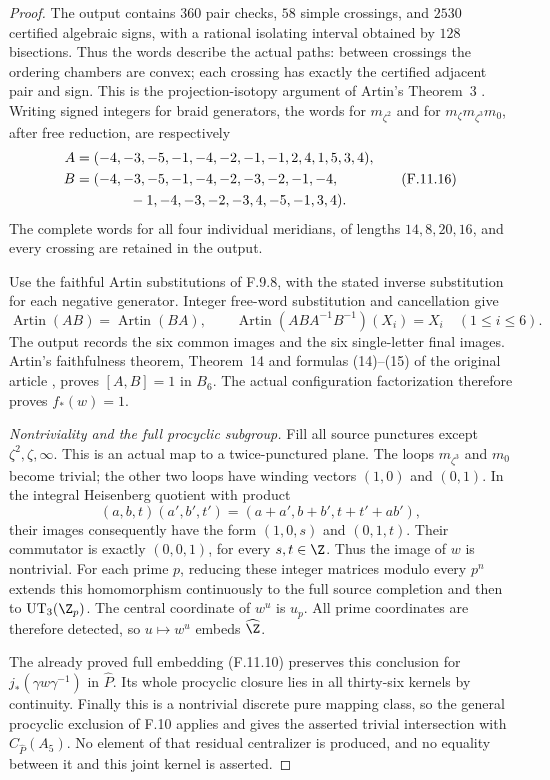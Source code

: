 \begin{proof}
The output contains $360$ pair checks,
$58$ simple crossings, and $2530$ certified
algebraic signs, with a rational isolating
interval obtained by $128$ bisections.
Thus the words describe the actual paths:
between crossings the ordering chambers
are convex; each crossing has exactly the
certified adjacent pair and sign.
This is the projection-isotopy argument
of Artin's Theorem~3 \cite{A-Artin1947}.
Writing signed integers for braid generators,
the words for $m_{\zeta^2}$ and for
$m_\zeta m_{\zeta^3}m_0$, after free reduction,
are respectively
\[
\begin{split}
 A={}&(-4,-3,-5,-1,-4,-2,-1,-1,2,4,1,5,3,4),\\
 B={}&(-4,-3,-5,-1,-4,-2,-3,-2,-1,-4,\\
     &\hspace{9mm}-1,-4,-3,-2,-3,4,-5,-1,3,4).
\end{split}                                                     \tag{F.11.16}
\]
The complete words for all four individual
meridians, of lengths $14,8,20,16$, and
every crossing are retained in the output.

Use the faithful Artin substitutions of F.9.8,
with the stated inverse substitution for
each negative generator.  Integer free-word
substitution and cancellation give
\[
       \operatorname{Artin}(AB)
           =\operatorname{Artin}(BA),\qquad
       \operatorname{Artin}(ABA^{-1}B^{-1})(X_i)=X_i
                    \quad(1\leq i\leq6).                       \tag{F.11.17}
\]
The output records the six common images
and the six single-letter final images.
Artin's faithfulness theorem, Theorem~14
and formulas (14)--(15) of the original
article \cite{A-Artin1947}, proves
$[A,B]=1$ in $B_6$.
The actual configuration factorization
therefore proves $f_*(w)=1$.

\emph{Nontriviality and the full procyclic subgroup.}
Fill all source punctures except
$\zeta^2,\zeta,\infty$.
This is an actual map to a twice-punctured
plane.  The loops $m_{\zeta^3}$ and $m_0$
become trivial; the other two loops have
winding vectors $(1,0)$ and $(0,1)$.
In the integral Heisenberg quotient with
product
\[
 (a,b,t)(a',b',t')
       =(a+a',b+b',t+t'+ab'),
\]
their images consequently have the form
$(1,0,s)$ and $(0,1,t)$.
Their commutator is exactly $(0,0,1)$,
for every $s,t\in\Z$.
Thus the image of $w$ is nontrivial.
For each prime $p$, reducing these integer
matrices modulo every $p^n$ extends this
homomorphism continuously to the full
source completion and then to
$\operatorname{UT}_3(\Z_p)$.
The central coordinate of $w^u$ is $u_p$.
All prime coordinates are therefore
detected, so
$u\mapsto w^u$ embeds $\widehat\Z$.

The already proved full embedding
(F.11.10) preserves this conclusion for
$j_*(\gamma w\gamma^{-1})$ in $\widehat P$.
Its whole procyclic closure lies in all
thirty-six kernels by continuity.
Finally this is a nontrivial discrete
pure mapping class, so the general
procyclic exclusion of F.10 applies and
gives the asserted trivial intersection
with $C_{\widehat P}(A_5)$.
No element of that residual centralizer
is produced, and no equality between it
and this joint kernel is asserted.
\end{proof}
